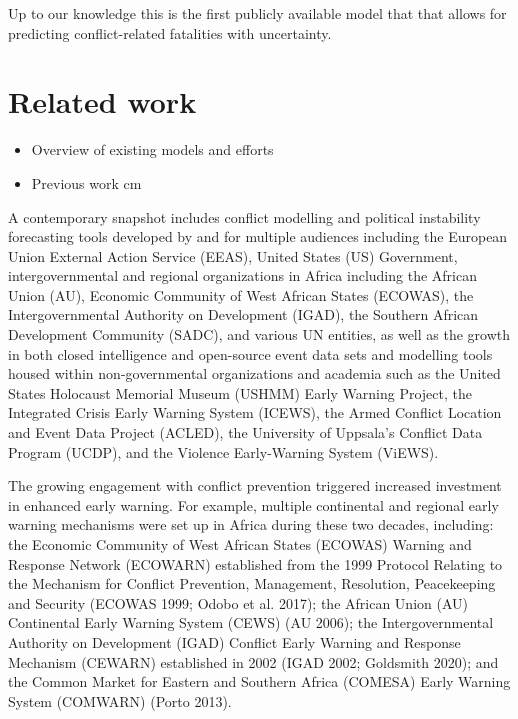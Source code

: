 \documentclass[runningheads]{llncs}
\begin{document}
    Up to our knowledge this is the first publicly available model that that allows for predicting conflict-related fatalities with uncertainty.


    \section{Related work}
    \begin{itemize}
        \item Overview of existing models and efforts
        \item Previous work cm
    \end{itemize}


    A contemporary snapshot includes conflict modelling and political instability forecasting tools developed by and for multiple audiences including the European Union External Action Service (EEAS), United States (US) Government, intergovernmental and regional organizations in Africa including the African Union (AU), Economic Community of West African States (ECOWAS), the Intergovernmental Authority on Development (IGAD), the Southern African Development Community (SADC), and various UN entities, as well as the growth in both closed intelligence and open-source event data sets and modelling tools housed within non-governmental organizations and academia such as the United States Holocaust Memorial Museum (USHMM) Early Warning Project, the Integrated Crisis Early Warning System (ICEWS), the Armed Conflict Location and Event Data Project (ACLED), the University of Uppsala’s Conflict Data Program (UCDP), and the Violence Early-Warning System (ViEWS).

    The growing engagement with conflict prevention triggered increased investment in enhanced early warning. For example, multiple continental and regional early warning mechanisms were set up in Africa during these two decades, including: the Economic Community of West African States (ECOWAS) Warning and Response Network (ECOWARN) established from the 1999 Protocol Relating to the Mechanism for Conflict Prevention, Management, Resolution, Peacekeeping and Security (ECOWAS 1999; Odobo et al. 2017); the African Union (AU) Continental Early Warning System (CEWS) (AU 2006); the Intergovernmental Authority on
    Development (IGAD) Conflict Early Warning and Response Mechanism (CEWARN) established in 2002 (IGAD 2002; Goldsmith 2020); and the Common Market for Eastern and Southern Africa (COMESA) Early Warning System (COMWARN) (Porto 2013).
\end{document}
